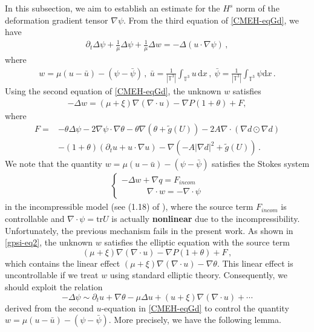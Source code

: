 \documentclass[reqno,11pt]{amsart}
\numberwithin{equation}{section}
\def\p{\partial}
\def\d{\mathrm{d}}
\begin{document}
In this subsection, we aim to establish an estimate for the $H^s$ norm of the deformation gradient tensor $\nabla \psi$. From the third equation of \eqref{CMEH-eqGd}, we have
\begin{equation}\label{gpsi-eq1}
\begin{aligned}
\partial_t \Delta \psi + \frac{1}{\mu} \Delta \psi + \frac{1}{\mu} \Delta w = -\Delta \left( u \cdot \nabla \psi \right) \,,
\end{aligned}
\end{equation}
where
\begin{equation*}
  \begin{aligned}
    w = \mu  ( u - \bar{u}) - ( \psi - \bar{\psi} ) \,, \ \bar{u} = \frac{1}{|\mathbb{T}^3|} \int_{\mathbb{T}^3} u \, \d x \,, \ \bar{\psi} = \frac{1}{|\mathbb{\mathbb{T}}^3|} \int_{\mathbb{T}^3} \psi \d x \,.
  \end{aligned}
\end{equation*}
Using the second equation of \eqref{CMEH-eqGd}, the unknown $w$ satisfies 
\begin{align}\label{gpsi-eq2}
-\Delta w = (\mu + \xi) \nabla (\nabla \cdot u) - \nabla P(1+\theta) + F, 
\end{align}
where
\begin{equation*}
  \begin{aligned}
    F = & -\theta \Delta \psi - 2 \nabla \psi \cdot \nabla \theta - \theta \nabla \left( \theta + \tilde{g}(U) \right) - 2A \nabla \cdot \left( \nabla d \odot \nabla d \right) \\
    & - (1+\theta) \left( \partial_t u + u \cdot \nabla u \right) - \nabla \left( -A |\nabla d|^2 + \tilde{g}(U) \right) \,.
  \end{aligned}
\end{equation*}
We note that the quantity $w=\mu(u-\bar{u})-(\psi-\bar{\psi})$ satisfies the Stokes system
\begin{align}\label{gpsi-eq3}
\begin{cases}
-\Delta w +\nabla q=F_{incom} \\
\qquad\quad\nabla\cdot w=-\nabla\cdot \psi
\end{cases}
\end{align}
 in the incompressible model (see (1.18) of \cite{JLL-JDE-2023}), where the source term $F_{incom}$ is controllable and $\nabla\cdot \psi = \mathrm{tr} U$ is actually {\bf nonlinear} due to the incompressibility. Unfortunately, the previous mechanism fails in the present work. As shown in \eqref{gpsi-eq2}, the unknown $w$ satisfies the elliptic equation with the source term 
 $$(\mu+\xi)\nabla(\nabla\cdot u )-\nabla P(1+\theta)+F \,,$$
 which contains the linear effect $(\mu+\xi)\nabla(\nabla\cdot u )-\nabla\theta$. This linear effect is uncontrollable if we treat $w$ using standard elliptic theory. Consequently, we should exploit the relation
 $$ - \Delta \psi \sim \p_t u + \nabla \theta - \mu \Delta u + ( u + \xi ) \nabla ( \nabla \cdot u ) + \cdots $$ 
derived from the second $u$-equation in \eqref{CMEH-eqGd} to control the quantity $ w = \mu ( u - \bar{u} ) - ( \psi - \bar{\psi} )$. More precisely, we have the following lemma.
\end{document}
